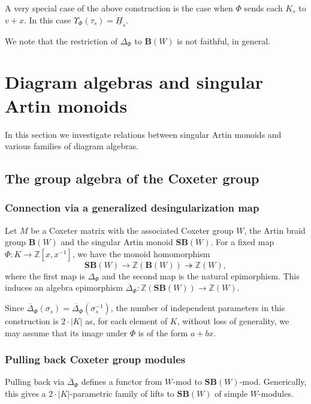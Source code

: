 \documentclass[a4paper]{amsart}
\newcommand{\tto}{\twoheadrightarrow}
\begin{document}
A very special case of the above construction is the case when $\Phi$ sends each $K_s$
to $v+x$. In this case $\Upsilon_\Phi(\tau_s)=\underline{H}_s$.

We note that the restriction of $\Delta_\Phi$ to $\mathbf{B}(W)$ is not
faithful,  in general.

\section{Diagram algebras and singular Artin monoids}\label{s4}

In this section we investigate relations between singular Artin monoids and various 
families of diagram algebras.

\subsection{The group algebra of the Coxeter group}\label{s4.1}

\subsubsection{Connection via a generalized desingularization map}\label{s4.1.1}

Let $M$ be a Coxeter matrix with the associated Coxeter group $W$, 
the Artin braid group $\mathbf{B}(W)$ and the singular Artin monoid $\mathbf{SB}(W)$.
For a fixed map $\Phi:K\to \mathbb{Z}[x,x^{-1}]$, we have the monoid homomorphism
\begin{displaymath}
\mathbf{SB}(W)\to \mathbb{Z}(\mathbf{B}(W))\tto \mathbb{Z}(W), 
\end{displaymath}
where the first map is $\Delta_\Phi$ and the second map is the natural epimorphism.
This induces an algebra epimorphism $\overline{\Delta}_\Phi:\mathbb{Z}(\mathbf{SB}(W))\to 
\mathbb{Z}(W)$.

Since $\overline{\Delta}_\Phi(\sigma_s)=\overline{\Delta}_\Phi(\sigma_s^{-1})$, the number
of independent parameters in this construction is $2\cdot |K|$ as, for each 
element of $K$, without loss of generality, we may assume that its image under $\Phi$ 
is of the form $a+bx$.

\subsubsection{Pulling back Coxeter group modules}\label{s4.1.2}

Pulling back via $\overline{\Delta}_\Phi$ defines a functor from $W$-mod to $\mathbf{SB}(W)$-mod.
Generically, this gives a $2\cdot |K|$-parametric family of lifts to $\mathbf{SB}(W)$ of
simple $W$-modules. 
\end{document}

